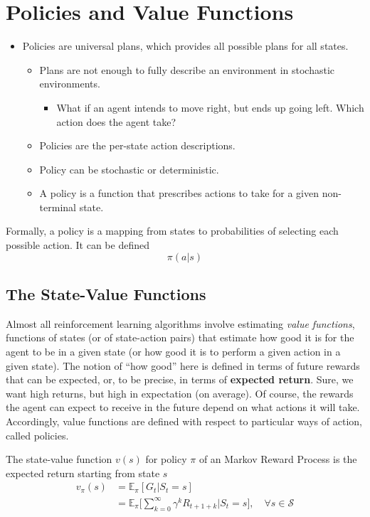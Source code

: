\section{Policies and Value Functions}
\begin{itemize}
	\item Policies are universal plans, which provides all possible plans for all states. 
		\begin{itemize}
			\item Plans are not enough to fully describe an environment in stochastic environments.
				\begin{itemize}
					\item What if an agent intends to move right, but ends up going left. Which action does the agent take?
				\end{itemize}
			\item Policies are the per-state action descriptions.
			\item Policy can be stochastic or deterministic.
			\item A policy is a function that prescribes actions to take for a given non-terminal state.
		\end{itemize}
\end{itemize}

Formally, a policy is a mapping from states to probabilities of selecting each possible action. It can be defined 
$$\pi(a|s)$$

\subsection{The State-Value Functions}

Almost all reinforcement learning algorithms involve estimating \textit{value functions}, functions of states (or of state-action pairs) that estimate how good it is for the agent to be in a given state (or how good it is to perform a given action in a given state). The notion of ``how good'' here is defined in terms of future rewards that can be expected, or, to be precise, in terms of \textbf{expected return}. Sure, we want high returns, but high in expectation (on average). Of course, the rewards the agent can expect to receive in the future depend on what actions it will take. Accordingly, value functions are defined with respect to particular ways of action, called policies. 

\begin{definition}
	The state-value function $v(s)$ for policy $\pi$ of an Markov Reward Process is the expected return starting from state $s$
	\begin{align*}
		v_{\pi}(s) &= \mathbb{E}_\pi[G_t|S_t=s]\\
				   &= \mathbb{E}_\pi \Bigg[\sum_{k=0}^\infty \gamma^kR_{t+1+k}\Big|S_t=s\Bigg], \quad \forall s\in \mathcal{S}
	\end{align*}
	$$$$
\end{definition}

